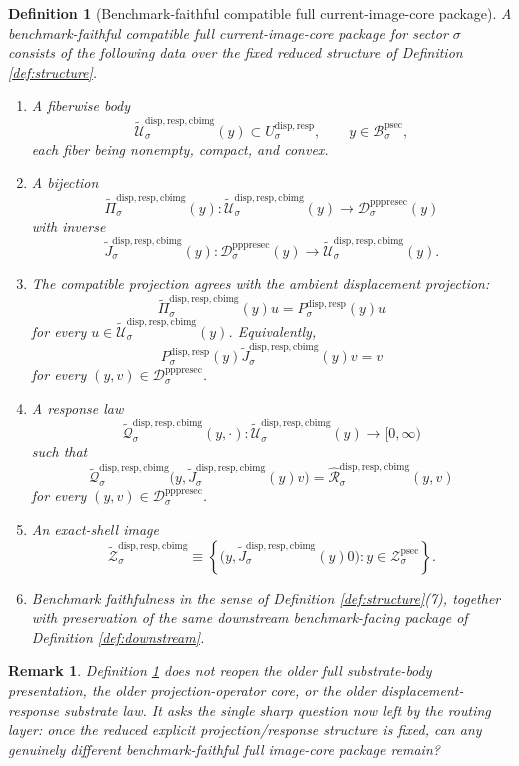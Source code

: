 \documentclass[11pt]{article}
\newcommand{\ProtoSectionBody}[1]{\mathcal B_{#1}^{\mathrm{psec}}}
\newcommand{\ProtoSectionShell}[1]{\mathcal Z_{#1}^{\mathrm{psec}}}
\newcommand{\PrePreProtoSectionResidualBody}[1]{\mathcal D_{#1}^{\mathrm{pppresec}}}
\newcommand{\SubstrateCarrier}[1]{U_{#1}^{\mathrm{disp,resp}}}
\newcommand{\SubstrateProjection}[1]{P_{#1}^{\mathrm{disp,resp}}}
\newcommand{\CoreForcedBodyResponse}[1]{\widehat{\mathscr R}_{#1}^{\mathrm{disp,resp,cbimg}}}
\newcommand{\CompatibleImageBody}[1]{\widetilde{\mathcal U}_{#1}^{\mathrm{disp,resp,cbimg}}}
\newcommand{\CompatibleImageProjection}[1]{\widetilde{\Pi}_{#1}^{\mathrm{disp,resp,cbimg}}}
\newcommand{\CompatibleImageLift}[1]{\widetilde J_{#1}^{\mathrm{disp,resp,cbimg}}}
\newcommand{\CompatibleImageResponseLaw}[1]{\widetilde{\mathscr Q}_{#1}^{\mathrm{disp,resp,cbimg}}}
\newcommand{\CompatibleImageShell}[1]{\widetilde{\mathcal Z}_{#1}^{\mathrm{disp,resp,cbimg}}}
\newtheorem{definition}{Definition}
\newtheorem{remark}{Remark}
\begin{document}
\begin{definition}[Benchmark-faithful compatible full current-image-core package]
\label{def:compatible}
A \emph{benchmark-faithful compatible full current-image-core package} for sector \(\sigma\) consists of the following data over the fixed reduced structure of Definition \ref{def:structure}.
\begin{enumerate}
    \item A fiberwise body
    \[
    \CompatibleImageBody{\sigma}(y)\subset\SubstrateCarrier{\sigma},
    \qquad
    y\in\ProtoSectionBody{\sigma},
    \]
    each fiber being nonempty, compact, and convex.
    \item A bijection
    \[
    \CompatibleImageProjection{\sigma}(y):
    \CompatibleImageBody{\sigma}(y)\to\PrePreProtoSectionResidualBody{\sigma}(y)
    \]
    with inverse
    \[
    \CompatibleImageLift{\sigma}(y):
    \PrePreProtoSectionResidualBody{\sigma}(y)\to\CompatibleImageBody{\sigma}(y).
    \]
    \item The compatible projection agrees with the ambient displacement projection:
    \[
    \CompatibleImageProjection{\sigma}(y)u
    =
    \SubstrateProjection{\sigma}(y)u
    \]
    for every \(u\in\CompatibleImageBody{\sigma}(y)\). Equivalently,
    \[
    \SubstrateProjection{\sigma}(y)\CompatibleImageLift{\sigma}(y)v=v
    \]
    for every \((y,v)\in\PrePreProtoSectionResidualBody{\sigma}\).
    \item A response law
    \[
    \CompatibleImageResponseLaw{\sigma}(y,\cdot):
    \CompatibleImageBody{\sigma}(y)\to[0,\infty)
    \]
    such that
    \[
    \CompatibleImageResponseLaw{\sigma}\bigl(y,\CompatibleImageLift{\sigma}(y)v\bigr)
    =
    \CoreForcedBodyResponse{\sigma}(y,v)
    \]
    for every \((y,v)\in\PrePreProtoSectionResidualBody{\sigma}\).
    \item An exact-shell image
    \[
    \CompatibleImageShell{\sigma}
    \equiv
    \left\{
    \bigl(y,\CompatibleImageLift{\sigma}(y)0\bigr):y\in\ProtoSectionShell{\sigma}
    \right\}.
    \]
    \item Benchmark faithfulness in the sense of Definition \ref{def:structure}(7), together with preservation of the same downstream benchmark-facing package of Definition \ref{def:downstream}.
\end{enumerate}
\end{definition}

\begin{remark}
Definition \ref{def:compatible} does not reopen the older full substrate-body presentation, the older projection-operator core, or the older displacement-response substrate law. It asks the single sharp question now left by the routing layer: once the reduced explicit projection/response structure is fixed, can any genuinely different benchmark-faithful \emph{full} image-core package remain?
\end{remark}
\end{document}
